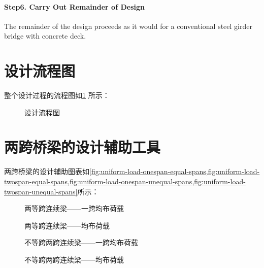 \paragraph*{Step6. Carry Out Remainder of Design}

The remainder of the design proceeds as it would for a conventional steel girder bridge with concrete deck.


\section{设计流程图}
整个设计过程的流程图如\cref{fig:design-flowchart} 所示：

\begin{figure}
  \caption{设计流程图}
  \label{fig:design-flowchart}
\end{figure}

\section{两跨桥梁的设计辅助工具}
\label{sec:design-aids}
两跨桥梁的设计辅助图表如\cref{fig:uniform-load-onespan-equal-spans,fig:uniform-load-twospan-equal-spans,fig:uniform-load-onespan-unequal-spans,fig:uniform-load-twospan-unequal-spans}所示：

\begin{figure}
  \caption{两等跨连续梁——一跨均布荷载}
  \label{fig:uniform-load-onespan-equal-spans}
  \caption{两等跨连续梁——均布荷载}
  \label{fig:uniform-load-twospan-equal-spans}
  \caption{不等跨两跨连续梁——一跨均布荷载}
  \label{fig:uniform-load-onespan-unequal-spans}
  \caption{不等跨两跨连续梁——均布荷载}
  \label{fig:uniform-load-twospan-unequal-spans}
\end{figure}